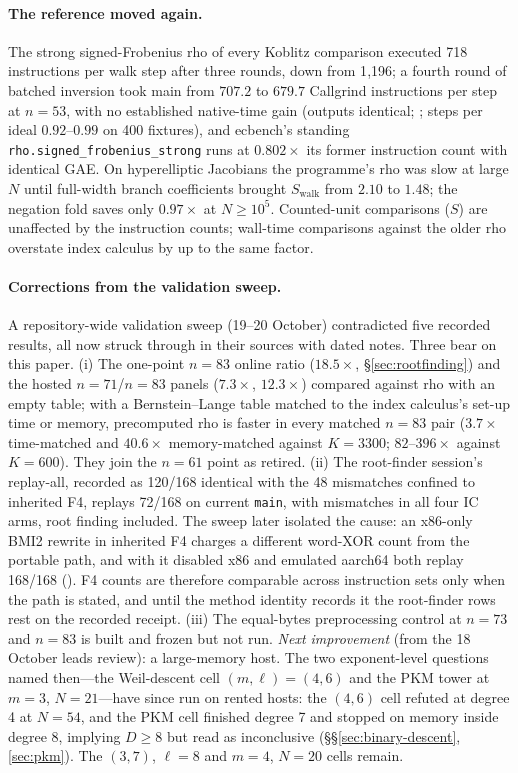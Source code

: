 \paragraph{The reference moved again.} The strong signed-Frobenius rho of
every Koblitz comparison executed 718 instructions per walk step after
three rounds, down from 1{,}196; a fourth round of batched inversion took
main from $707.2$ to $679.7$ Callgrind instructions per step at $n=53$, with
no established native-time gain (outputs identical;
; steps per ideal
$0.92$--$0.99$ on 400 fixtures), and ecbench's standing
\texttt{rho.signed\_frobenius\_strong} runs at $0.802\times$ its former
instruction count with identical GAE. On hyperelliptic Jacobians the
programme's rho was slow at large $N$ until full-width branch coefficients
brought $S_\text{walk}$ from $2.10$ to $1.48$; the negation fold saves only
$0.97\times$ at $N\ge10^5$. Counted-unit comparisons ($S$) are unaffected
by the instruction counts; wall-time comparisons against the older rho
overstate index calculus by up to the same factor.

\paragraph{Corrections from the validation sweep.} A repository-wide
validation sweep (19--20 October) contradicted five recorded results, all
now struck through in their sources with dated notes. Three bear on this
paper. (i) The one-point $n=83$ online ratio ($18.5\times$,
\S\ref{sec:rootfinding}) and the hosted $n=71$/$n=83$ panels ($7.3\times$,
$12.3\times$) compared against rho with an empty table; with a
Bernstein--Lange table matched to the index calculus's set-up time or
memory, precomputed rho is faster in every matched $n=83$ pair
($3.7\times$ time-matched and $40.6\times$ memory-matched against $K=3300$;
$82$--$396\times$ against $K=600$). They join the $n=61$ point as retired.
(ii) The root-finder session's replay-all, recorded as 120/168 identical with
the 48 mismatches confined to inherited F4, replays 72/168 on current
\texttt{main}, with mismatches in all four IC arms, root finding included.
The sweep later isolated the cause: an x86-only BMI2 rewrite in inherited F4
charges a different word-XOR count from the portable path, and with it
disabled x86 and emulated aarch64 both replay 168/168
().
F4 counts are therefore comparable across instruction sets only when the
path is stated, and until the method identity records it the root-finder
rows rest on the recorded receipt. (iii) The equal-bytes preprocessing control at
$n=73$ and $n=83$ is built and frozen but not run.
\emph{Next improvement} (from the 18 October leads review): a large-memory
host. The two exponent-level questions named then---the Weil-descent cell
$(m,\ell)=(4,6)$ and the PKM tower at $m=3$, $N=21$---have since run on
rented hosts: the $(4,6)$ cell refuted at degree 4 at $N=54$, and the PKM
cell finished degree 7 and stopped on memory inside degree 8, implying
$D\ge8$ but read as inconclusive (\S\S\ref{sec:binary-descent},\ref{sec:pkm}).
The $(3,7)$, $\ell=8$ and $m=4$, $N=20$ cells remain.

